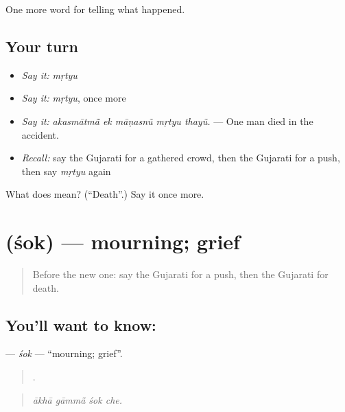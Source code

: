 \begin{grammarlens}[title={What you've built}]
One more word for telling what happened.
\end{grammarlens}

\subsection*{Your turn}
\begin{itemize}
\raggedright
  \item \emph{Say it:} \emph{mṛtyu}
  \item \emph{Say it:} \emph{mṛtyu}, once more
  \item \emph{Say it:} \emph{akasmātmā̃ ek māṇasnũ mṛtyu thayũ.} — One man died in the accident.
  \item \emph{Recall:} say the Gujarati for a gathered crowd, then the Gujarati for a push, then say \emph{mṛtyu} again
\end{itemize}

\begin{tcolorbox}[breakable,colback=teal!4,colframe=teal!35!black,title={Before you move on}]
What does  mean? (\textquotedblleft{}Death\textquotedblright{}.) Say it once more.
\end{tcolorbox}
\section[\texorpdfstring{\gu{શોક} (śok)}{શોક (śok)}]{ (śok) — mourning; grief}

\label{lesson:GU-C298-sok}



\begin{quote}
Before the new one: say the Gujarati for a push, then the Gujarati for death.
\end{quote}

\subsection*{You'll want to know: }
\textbf{} — \emph{śok} — \textquotedblleft{}mourning; grief\textquotedblright{}.

\begin{quote}
   .
\end{quote}

\begin{quote}
\emph{ākhā gāmmā̃ śok che.}
\end{quote}

